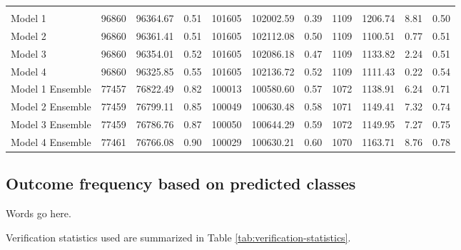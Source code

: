 \documentclass[]{elsarticle} %
\begin{document}
\begin{landscape}
\begin{table}
\begin{tabular}[t]{lrrrrrrrrrr}
\addlinespace[0.3em]
\multicolumn{11}{l}{\textbf{Out-of-sample (backcasting using 2016 dataset)}}\\
\hspace{1em}Model 1 & 96860 & 96364.67 & 0.51 & 101605 & 102002.59 & 0.39 & 1109 & 1206.74 & 8.81 & 0.50\\
\rowcolor{gray!15}
\hspace{1em}Model 2 & 96860 & 96361.41 & 0.51 & 101605 & 102112.08 & 0.50 & 1109 & 1100.51 & 0.77 & 0.51\\
\hspace{1em}Model 3 & 96860 & 96354.01 & 0.52 & 101605 & 102086.18 & 0.47 & 1109 & 1133.82 & 2.24 & 0.51\\
\rowcolor{gray!15}
\hspace{1em}Model 4 & 96860 & 96325.85 & 0.55 & 101605 & 102136.72 & 0.52 & 1109 & 1111.43 & 0.22 & 0.54\\
\hspace{1em}Model 1 Ensemble & 77457 & 76822.49 & 0.82 & 100013 & 100580.60 & 0.57 & 1072 & 1138.91 & 6.24 & 0.71\\
\rowcolor{gray!15}
\hspace{1em}Model 2 Ensemble & 77459 & 76799.11 & 0.85 & 100049 & 100630.48 & 0.58 & 1071 & 1149.41 & 7.32 & 0.74\\
\hspace{1em}Model 3 Ensemble & 77459 & 76786.76 & 0.87 & 100050 & 100644.29 & 0.59 & 1072 & 1149.95 & 7.27 & 0.75\\
\rowcolor{gray!15}
Model 4 Ensemble & 77461 & 76766.08 & 0.90 & 100029 & 100630.21 & 0.60 & 1070 & 1163.71 & 8.76 & 0.78\\
\bottomrule
\end{tabular}
\end{table}
\end{landscape}

\hypertarget{outcome-frequency-based-on-predicted-classes}{%
\subsection{Outcome frequency based on predicted
classes}\label{outcome-frequency-based-on-predicted-classes}}

Words go here.

Verification statistics used are summarized in Table
\ref{tab:verification-statistics}.
\end{document}

